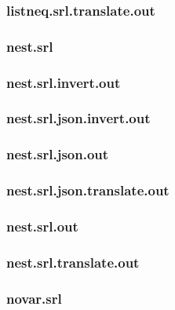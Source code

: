 \subsubsection{listneq.srl.translate.out}
\label{app:listneq_srl.translate.out}

\subsubsection{nest.srl}
\label{app:nest_srl}

\subsubsection{nest.srl.invert.out}
\label{app:nest_srl.invert.out}

\subsubsection{nest.srl.json.invert.out}
\label{app:nest_srl.json.invert.out}

\subsubsection{nest.srl.json.out}
\label{app:nest_srl.json.out}

\subsubsection{nest.srl.json.translate.out}
\label{app:nest_srl.json.translate.out}

\subsubsection{nest.srl.out}
\label{app:nest_srl.out}

\subsubsection{nest.srl.translate.out}
\label{app:nest_srl.translate.out}

\subsubsection{novar.srl}
\label{app:novar_srl}

